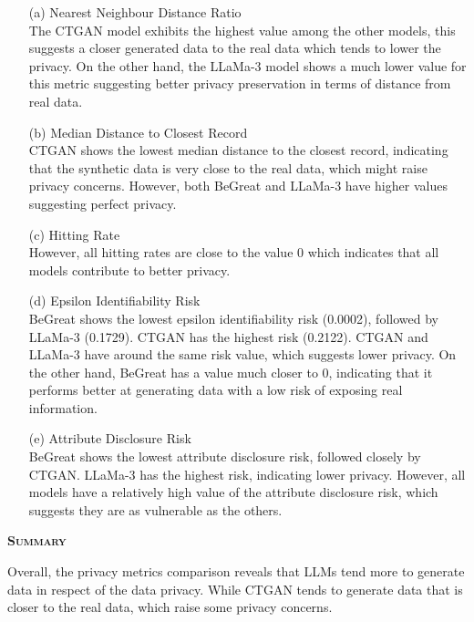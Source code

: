 \begin{enumerate}
    \item[(a)] Nearest Neighbour Distance Ratio \\
    The CTGAN model exhibits the highest value among the other models, this suggests a closer generated data to the real data which tends to lower the privacy. On the other hand, the LLaMa-3 model shows a much lower value for this metric suggesting better privacy preservation in terms of distance from real data.

    \item[(b)] Median Distance to Closest Record \\
    CTGAN shows the lowest median distance to the closest record, indicating that the synthetic data is very close to the real data, which might raise privacy concerns. However, both BeGreat and LLaMa-3 have higher values suggesting perfect privacy.

    
    \item[(c)] Hitting Rate \\
    However, all hitting rates are close to the value 0 which indicates that all models contribute to better privacy.


    \item[(d)] Epsilon Identifiability Risk \\
    BeGreat shows the lowest epsilon identifiability risk (0.0002), followed by LLaMa-3 (0.1729). CTGAN has the highest risk (0.2122). CTGAN and LLaMa-3 have around the same risk value, which suggests lower privacy. On the other hand, BeGreat has a value much closer to 0, indicating that it performs better at generating data with a low risk of exposing real information. 

    \item[(e)] Attribute Disclosure Risk \\
    BeGreat shows the lowest attribute disclosure risk, followed closely by CTGAN. LLaMa-3 has the highest risk, indicating lower privacy. However, all models have a relatively high value of the attribute disclosure risk, which suggests they are as vulnerable as the others. %
    
\end{enumerate}



\vspace{1cm}

\noindent \textsc{ \textbf{Summary}}

Overall, the privacy metrics comparison reveals that LLMs tend more to generate data in respect of the data privacy. While CTGAN tends to generate data that is closer to the real data, which raise some privacy concerns.

